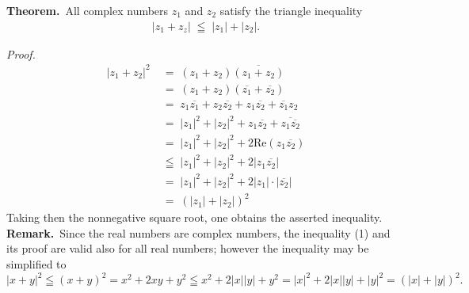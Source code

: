 \documentclass[12pt]{article}
\theoremstyle{definition}
\begin{document}
\textbf{Theorem.}\, All complex numbers $z_1$ and $z_2$ satisfy the triangle inequality
\begin{align}
|z_1\!+\!z_z| \;\leqq\;|z_1|+|z_2|.
\end{align}

\emph{Proof.}
\begin{align*}
|z_1\!+\!z_2|^2 &\;=\; (z_1+z_2)\overline{(z_1+z_2)}\\
&\;=\; (z_1+z_2)(\overline{z_1}+\overline{z_2})\\
&\;=\; z_1\overline{z_1}+z_2\overline{z_2}+z_1\overline{z_2}+\overline{z_1}z_2\\
&\;=\; |z_1|^2+|z_2|^2+z_1\overline{z_2}+\overline{z_1\overline{z_2}}\\
&\;=\; |z_1|^2+|z_2|^2+2\mbox{Re}(z_1\overline{z_2})\\
&\;\leqq\; |z_1|^2+|z_2|^2+2|z_1\overline{z_2}|\\
&\;=\; |z_1|^2+|z_2|^2+2|z_1|\cdot|\overline{z_2}|\\
&\;=\; (|z_1|+|z_2|)^2
\end{align*}
Taking then the nonnegative square root, one obtains the asserted inequality.\\


\textbf{Remark.}\, Since the real numbers are complex numbers, the inequality (1) and its proof are valid also for all real numbers; however the inequality  may be simplified to
$$|x+y|^2 \leqq (x+y)^2 = x^2+2xy+y^2 \leqq x^2+2|x||y|+y^2 = |x|^2+2|x||y|+|y|^2 = (|x|+|y|)^2.$$

\end{document}
